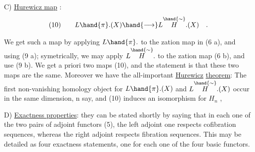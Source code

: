 C) \uline{Hurewicz map} :
\[
(10)\qquad L\hand{\pi}.(X) \hand{\longrightarrow} L\overset{\hand{\sim}}{H}.(X) \quad .
\]

We get such a map by applying $L\hand{\pi}.$ to the zation map in
(6 a), and using (9 a); symetrically, we may apply $L\overset{\hand{\sim}}{H}.$ to the
zation map (6 b), and use (9 b). We get a priori two maps
(10), and the statement is that these two maps are the same. Moreover
we have the all-important \uline{Hurewicz} \uline{theorem}: The first non-vanishing
homology object for $L\hand{\pi}.(X)$ and $L\overset{\hand{\sim}}{H}.(X)$ occur in the same dimension, n
say, and (10) induces an isomorphism for $H_n$ , 

D) \uline{Exactness properties}: they can be stated shortly by saying that
in each one of the two pairs of adjoint functors (5), the left adjoint
one  respects cofibration sequences, whereas the right
adjoint respects fibration sequences. This may be detailed as four
exactness statements, one for each one of the four basic functors.


